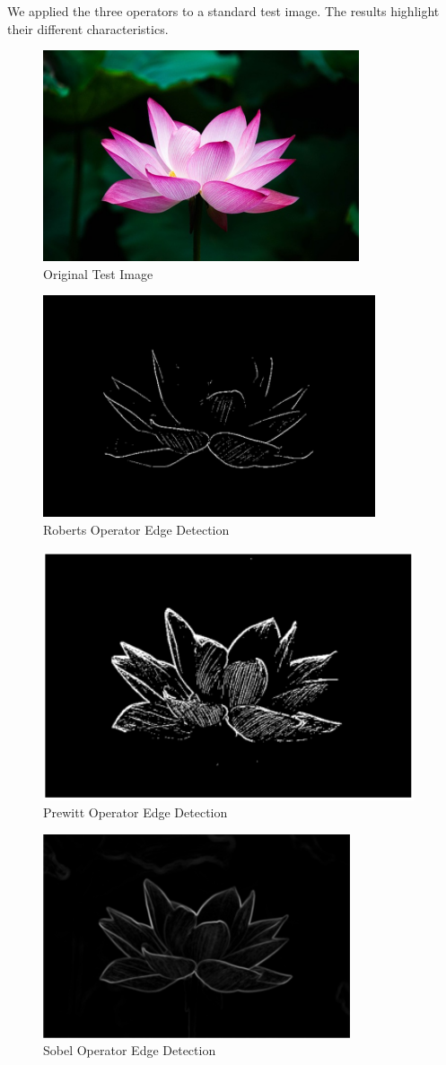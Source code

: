 \documentclass[final]{beamer}
\newlength{\colwidth}
\begin{document}
\begin{frame}[t]
\begin{columns}[t]
\begin{column}{\colwidth}
    We applied the three operators to a standard test image. The results highlight their different characteristics.
    \begin{figure}[h!]
  \centering
  \includegraphics[width=0.47\linewidth]{logoss/original.png}
  \caption{Original Test Image}
  \label{fig:original}
\end{figure}

\begin{figure}[h!]
  \centering
  \includegraphics[width=0.47\linewidth]{logoss/robert.png}
  \caption{Roberts Operator Edge Detection}
  \label{fig:roberts}
\end{figure}

\begin{figure}[h!]
  \centering
  \includegraphics[width=0.47\linewidth]{logoss/Prewitt.png}
  \caption{Prewitt Operator Edge Detection}
  \label{fig:prewitt}
\end{figure}

\begin{figure}[h!]
  \centering
  \includegraphics[width=0.47\linewidth]{logoss/sobel.png}
  \caption{Sobel Operator Edge Detection}
  \label{fig:sobel}
\end{figure}


\end{column}
\end{columns}
\end{frame}
\end{document}

